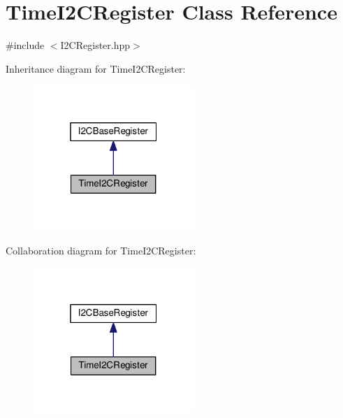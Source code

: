 \hypertarget{class_time_i2_c_register}{}\section{Time\+I2\+C\+Register Class Reference}
\label{class_time_i2_c_register}


{\ttfamily \#include $<$I2\+C\+Register.\+hpp$>$}



Inheritance diagram for Time\+I2\+C\+Register\+:\nopagebreak
\begin{figure}[H]
\begin{center}
\leavevmode
\includegraphics[width=172pt]{class_time_i2_c_register__inherit__graph}
\end{center}
\end{figure}


Collaboration diagram for Time\+I2\+C\+Register\+:\nopagebreak
\begin{figure}[H]
\begin{center}
\leavevmode
\includegraphics[width=172pt]{class_time_i2_c_register__coll__graph}
\end{center}
\end{figure}
